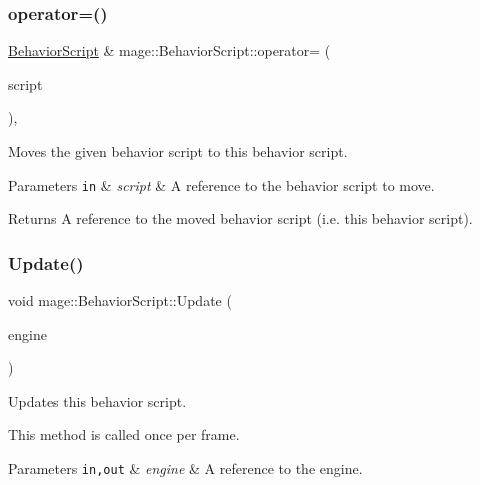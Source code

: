 \subsubsection{\texorpdfstring{operator=()}{operator=()}\hspace{0.1cm}{\footnotesize\ttfamily [2/2]}}
{\footnotesize\ttfamily \mbox{\hyperlink{classmage_1_1_behavior_script}{Behavior\+Script}} \& mage\+::\+Behavior\+Script\+::operator= (\begin{DoxyParamCaption}\item[{\mbox{\hyperlink{classmage_1_1_behavior_script}{Behavior\+Script}} \&\&}]{script }\end{DoxyParamCaption})\hspace{0.3cm}{\ttfamily [default]}, {\ttfamily [noexcept]}}

Moves the given behavior script to this behavior script.


\begin{DoxyParams}[1]{Parameters}
\mbox{\tt in}  & {\em script} & A reference to the behavior script to move. \\
\hline
\end{DoxyParams}
\begin{DoxyReturn}{Returns}
A reference to the moved behavior script (i.\+e. this behavior script). 
\end{DoxyReturn}
\mbox{\label{classmage_1_1_behavior_script_a085634661326b59850c1111e537baa4e}} 
\subsubsection{\texorpdfstring{Update()}{Update()}}
{\footnotesize\ttfamily void mage\+::\+Behavior\+Script\+::\+Update (\begin{DoxyParamCaption}\item[{\mbox{[}\mbox{[}maybe\+\_\+unused\mbox{]} \mbox{]} \mbox{\hyperlink{classmage_1_1_engine}{Engine}} \&}]{engine }\end{DoxyParamCaption})\hspace{0.3cm}{\ttfamily [virtual]}}

Updates this behavior script.

This method is called once per frame.


\begin{DoxyParams}[1]{Parameters}
\mbox{\tt in,out}  & {\em engine} & A reference to the engine. \\
\hline
\end{DoxyParams}

